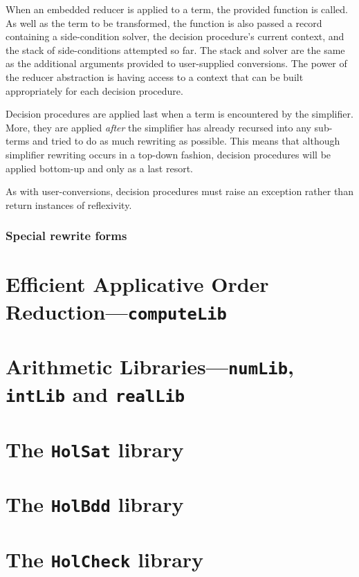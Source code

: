 When an embedded reducer is applied to a term, the provided 
function is called.  As well as the term to be transformed, the
 function is also passed a record containing a
side-condition solver, the decision procedure's current context, and
the stack of side-conditions attempted so far.  The stack and solver
are the same as the additional arguments provided to user-supplied
conversions.  The power of the reducer abstraction is having access to
a context that can be built appropriately for each decision procedure.

Decision procedures are applied last when a term is encountered by the
simplifier.  More, they are applied \emph{after} the simplifier has
already recursed into any sub-terms and tried to do as much rewriting
as possible.  This means that although simplifier rewriting occurs in
a top-down fashion, decision procedures will be applied bottom-up and
only as a last resort.

As with user-conversions, decision procedures must raise an exception
rather than return instances of reflexivity.

\subsubsection{Special rewrite forms}
\label{sec:simp-special-rewrite-forms}


\section{Efficient Applicative Order Reduction---\texttt{computeLib}}
\label{sec:computeLib}

\section{Arithmetic Libraries---\texttt{numLib}, \texttt{intLib} and \texttt{realLib}}
\label{sec:numLib}

\section{The \texttt{HolSat} library}\label{sec:HolSatLib}
\section{The \texttt{HolBdd} library}\label{sec:HolBddLib}
\section{The \texttt{HolCheck} library}\label{sec:HolCheckLib}



